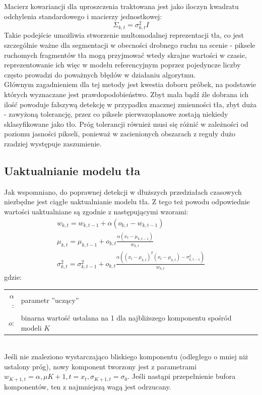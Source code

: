 Macierz kowariancji dla uproszczenia traktowana jest jako iloczyn kwadratu odchylenia standardowego i macierzy jednostkowej:
\begin{equation}
\Sigma_{k,t}=\sigma_{k,t}^2I
\end{equation}
Takie podejście umożliwia stworzenie multomodalnej reprezentacji tła, co jest szczególnie ważne dla segmentacji w obecności drobnego ruchu na scenie - piksele ruchomych fragmentów tła mogą przyjmować wtedy skrajne wartości w czasie, reprezentowanie ich więc w modelu referencyjnym poprzez pojedyncze liczby często prowadzi do poważnych błędów w działaniu algorytmu. \\ 
Głównym zagadnieniem dla tej metody jest kwestia doboru próbek, na podstawie których wyznaczane jest prawdopodobieństwo. Zbyt mała bądź źle dobrana ich ilość powoduje fałszywą detekcję w przypadku znacznej zmienności tła, zbyt duża - zawyżoną tolerancję, przez co piksele pierwszoplanowe zostają niekiedy sklasyfikowane jako tło. Próg tolerancji również musi się różnić w zależności od poziomu jasności pikseli, ponieważ w zacienionych obszarach z reguły dużo rzadziej występuje zaszumienie.
\subsection{Uaktualnianie modelu tła}
Jak wspomniano, do poprawnej detekcji w dłuższych przedziałach czasowych niezbędne jest ciągłe uaktualnianie modelu tła. Z tego też powodu odpowiednie wartości uaktualniane są zgodnie z następującymi wzorami:
\begin{gather}
w_{k,t} = w_{k,t-1}+\alpha(o_{k,t}-w_{k,t-1}) \\
\mu_{k,t} = \mu_{k,t-1}+o_{k,t}\frac{\alpha (x_{t}-\mu_{k,t-1})}{w_{k,t}} \\
\sigma^2_{k,t} = \sigma^2_{k,t-1}+o_{k,t}\frac{\alpha ((x_{t}-\mu_{k,t})^{T}(x_{t}-\mu_{k,t})-\sigma^2_{k,t-1})}{w_{k,t}}
\end{gather}
gdzie:\\ 
\hspace*{3em}
\begin{tabular}{r l}
$\alpha$: &  parametr ''uczący'' \\
$o$: & binarna wartość ustalana na 1 dla najbliższego komponentu spośród modeli $K$
\end{tabular} \\

Jeśli nie znaleziono wystarczająco bliskiego komponentu (odległego o mniej niż ustalony próg), nowy komponent tworzony jest z parametrami $w_{K+1,t} = \alpha, \mu{K+1,t}= x_{t}, \sigma_{K+1,t}=\sigma_{0}$. Jeśli nastąpi przepełnienie bufora komponentów, ten z najmniejszą wagą jest odrzucany. 
